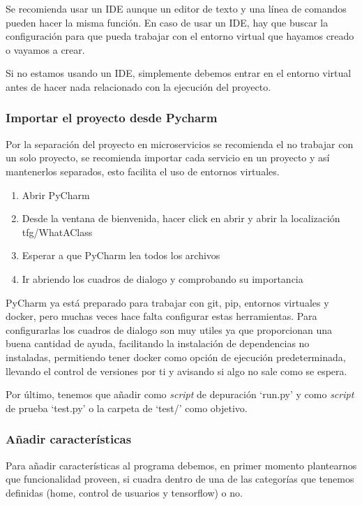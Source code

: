 Se recomienda usar un IDE aunque un editor de texto y una línea de comandos pueden hacer la misma función. En caso de usar un IDE, hay que buscar la configuración para que pueda trabajar con el entorno virtual que hayamos creado o vayamos a crear.

Si no estamos usando un IDE, simplemente debemos entrar en el entorno virtual antes de hacer nada relacionado con la ejecución del proyecto.


\subsubsection{Importar el proyecto desde Pycharm}

Por la separación del proyecto en microservicios se recomienda el no trabajar con un solo proyecto, se recomienda importar cada servicio en un proyecto y así mantenerlos separados, esto facilita el uso de entornos virtuales.


\begin{enumerate}
\setlength{\itemsep}{1pt}
\setlength{\parskip}{0pt}
\setlength{\parsep}{0pt}
\item Abrir PyCharm
\item Desde la ventana de bienvenida, hacer click en abrir y abrir la localización tfg/WhatAClass
\item Esperar a que PyCharm lea todos los archivos
\item Ir abriendo los cuadros de dialogo y comprobando su importancia
\end{enumerate}

PyCharm ya está preparado para trabajar con git, pip, entornos virtuales y docker, pero muchas veces hace falta configurar estas herramientas. Para configurarlas los cuadros de dialogo son muy utiles ya que proporcionan una buena cantidad de ayuda, facilitando la instalación de dependencias no instaladas, permitiendo tener docker como opción de ejecución predeterminada, llevando el control de versiones por ti y avisando si algo no sale como se espera.

Por último, tenemos que añadir como \emph{script} de depuración `run.py' y como \emph{script} de prueba `test.py' o la carpeta de `test/' como objetivo.

\subsubsection{Añadir características}

Para añadir características al programa debemos, en primer momento plantearnos que funcionalidad proveen, si cuadra dentro de una de las categorías que tenemos definidas (home, control de usuarios y tensorflow) o no. 

